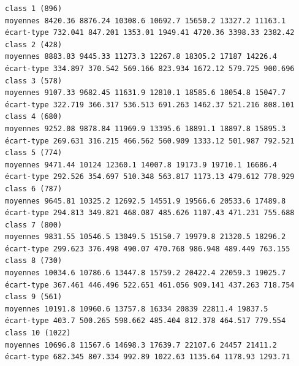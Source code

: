 \documentclass[environments,article,submit,pdftex,moreauthors]{Definitions/mdpi}
\begin{document}
\begin{scriptsize}
\begin{verbatim}
class 1 (896)
moyennes 8420.36 8876.24 10308.6 10692.7 15650.2 13327.2 11163.1
écart-type 732.041 847.201 1353.01 1949.41 4720.36 3398.33 2382.42
class 2 (428)
moyennes 8883.83 9445.33 11273.3 12267.8 18305.2 17187 14226.4
écart-type 334.897 370.542 569.166 823.934 1672.12 579.725 900.696
class 3 (578)
moyennes 9107.33 9682.45 11631.9 12810.1 18585.6 18054.8 15047.7
écart-type 322.719 366.317 536.513 691.263 1462.37 521.216 808.101
class 4 (680)
moyennes 9252.08 9878.84 11969.9 13395.6 18891.1 18897.8 15895.3
écart-type 269.631 316.215 466.562 560.909 1333.12 501.987 792.521
class 5 (774)
moyennes 9471.44 10124 12360.1 14007.8 19173.9 19710.1 16686.4
écart-type 292.526 354.697 510.348 563.817 1173.13 479.612 778.929
class 6 (787)
moyennes 9645.81 10325.2 12692.5 14551.9 19566.6 20533.6 17489.8
écart-type 294.813 349.821 468.087 485.626 1107.43 471.231 755.688
class 7 (800)
moyennes 9831.55 10546.5 13049.5 15150.7 19979.8 21320.5 18296.2
écart-type 299.623 376.498 490.07 470.768 986.948 489.449 763.155
class 8 (730)
moyennes 10034.6 10786.6 13447.8 15759.2 20422.4 22059.3 19025.7
écart-type 367.461 446.496 522.651 461.056 909.141 437.263 718.754
class 9 (561)
moyennes 10191.8 10960.6 13757.8 16334 20839 22811.4 19837.5
écart-type 403.7 500.265 598.662 485.404 812.378 464.517 779.554
class 10 (1022)
moyennes 10696.8 11567.6 14698.3 17639.7 22107.6 24457 21411.2
écart-type 682.345 807.334 992.89 1022.63 1135.64 1178.93 1293.71


\end{verbatim}
\end{scriptsize}
\end{document}

